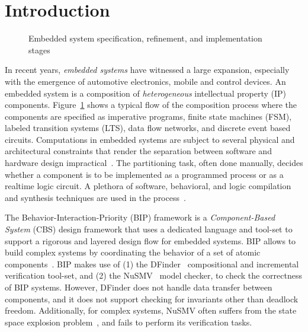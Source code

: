 \section{Introduction}
\label{sect-intro}

\begin{figure}
\resizebox{.9\columnwidth}{!}{
  
}
\caption{Embedded system specification, refinement, and implementation stages}
\label{fig:flow}
\end{figure}

In recent years, {\em embedded systems} have witnessed a large 
expansion, especially with  the emergence of automotive 
electronics, mobile and control devices.
An embedded system is a composition of {\em heterogeneous}
intellectual property (IP) components.
Figure~\ref{fig:flow} shows a typical flow of the composition process where the
components are specified as imperative programs, finite state machines (FSM), labeled 
transition systems (LTS), data flow networks, and discrete event based circuits. 
Computations in embedded systems are subject to several 
physical and architectural 
constraints that render the separation between software and 
hardware design impractical~\cite{henzinger2006embedded}.
The partitioning task, often done manually, decides whether a component is to 
be implemented as a programmed process or as a realtime logic circuit. 
A plethora of software, behavioral, and logic compilation and synthesis techniques are
used in the process~\cite{metropolis2}.


The Behavior-Interaction-Priority (BIP) framework 
is a {\em Component-Based System} (CBS) design framework that uses a dedicated 
language and tool-set to support a rigorous and layered design flow for embedded 
systems.  
BIP allows to build complex systems by coordinating the behavior of a set of 
atomic components~\cite{bip11}.
BIP makes use of (1) the DFinder~\cite{dfinder} compositional  
and incremental verification tool-set, and (2) the NuSMV~\cite{nusmv} model checker, 
to check the correctness of BIP systems. 
However, DFinder \cite{BBL14} does not handle data transfer between components, 
and it does not support checking for invariants other than deadlock freedom. 
Additionally, for complex systems, NuSMV often suffers from the state space explosion 
problem~\cite{sipser2006introduction}, and fails to perform its verification tasks.

